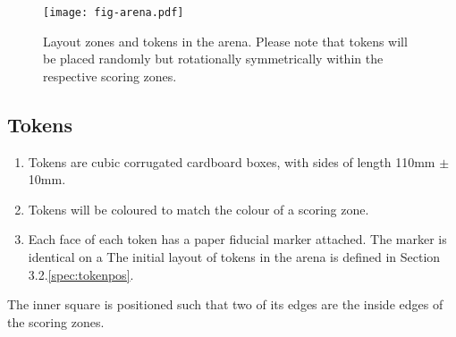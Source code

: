 \begin{figure}
  \texttt{[image: fig-arena.pdf]}
  \caption{Layout zones and tokens in the arena. Please note that tokens will
  be placed randomly but rotationally symmetrically within the respective
  scoring zones.}
  \label{fig:arena}
\end{figure}

\subsection{Tokens}
\label{spec:tokens}

\begin{enumerate}
  \item Tokens are cubic corrugated cardboard boxes, with sides of length
        \si{110}{mm} $\pm$ \si{10}{mm}.
  \item Tokens will be coloured to match the colour of a scoring zone.
  \item Each face of each token has a paper fiducial marker attached. The marker is
        identical on a The initial layout of tokens in the arena is defined in Section
  3.2.\ref{spec:tokenpos}.
\end{enumerate}
        The inner square is positioned such that two of its edges are the
        inside edges of the scoring zones.
